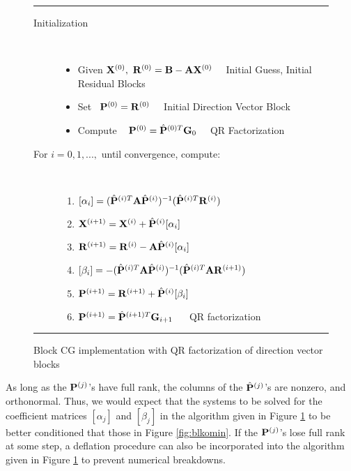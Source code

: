 \documentclass[twoside]{siamltex}
\newcommand{\bA}{{\bf A}}
\newcommand{\bB}{{\bf B}}
\newcommand{\bG}{{\bf G}}
\newcommand{\bP}{{\bf P}}
\newcommand{\bR}{{\bf R}}
\newcommand{\bX}{{\bf X}}
\begin{document}
\begin{figure}[hbt]
\vspace{.05in} \hrule \vspace{.1in}
\begin{description}
\item[Initialization]~~

\begin{itemize}
 \item Given $\bX^{(0)}, ~\bR^{(0)} = \bB - \bA \bX^{(0)}$ ~~Initial Guess,
 Initial Residual Blocks
 \item Set~ $\bP^{(0)} = \bR^{(0)}$ ~~Initial Direction Vector Block
 \item Compute ~ $\bP^{(0)} = {\hat \bP}^{(0)T} \bG_{0}$ ~~QR
 Factorization
 \end{itemize}

\item[For $i = 0,1,...,$ until convergence, compute:]~~

\begin{enumerate}

\item $[\alpha_i] = ( {\hat \bP}^{(i)T} \bA {\hat \bP}^{(i)})^{-1} ( {\hat \bP}^{(i)T}
\bR^{(i)})$
\item $\bX^{(i+1)} = \bX^{(i)} + {\hat \bP}^{(i)} [\alpha_i]$
\item $\bR^{(i+1)} = \bR^{(i)} - \bA {\hat \bP}^{(i)} [\alpha_i]$
\item $[\beta_i] = -( {\hat \bP}^{(i)T} \bA {\hat \bP}^{(i)})^{-1} ( {\hat \bP}^{(i)T} \bA \bR^{(i+1)})$
\item $\bP^{(i+1)} = \bR^{(i+1)} + {\hat \bP}^{(i)} [\beta_i]$
\item $\bP^{(i+1)} = {\hat \bP}^{(i+1)T} \bG_{i+1}$ ~~ QR
factorization

\end{enumerate}

\end{description}

\vspace{.1in} \hrule
 \caption{Block CG implementation with QR factorization of
 direction vector blocks} \label{fig:blkomin_qr}
\end{figure}

As long as the $\bP^{(j)}$'s have full rank, the columns of the
${\hat \bP}^{(j)}$'s are nonzero, and orthonormal. Thus, we would
expect that the systems to be solved for the coefficient matrices
$[\alpha_j]$ and $[\beta_j]$ in the algorithm given in Figure
\ref{fig:blkomin_qr} to be better conditioned that those in Figure
\ref{fig:blkomin}. If the $\bP^{(j)}$'s lose full rank at some
step, a deflation procedure can also be incorporated into the
algorithm given in Figure \ref{fig:blkomin_qr} to prevent
numerical breakdowns.
\end{document}
